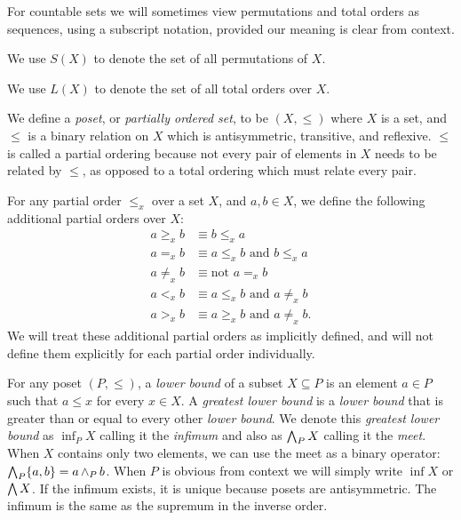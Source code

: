 	For countable sets we will sometimes view permutations and total orders as sequences, using a subscript notation, provided our meaning is clear from context.

	\begin{definition}
		We use $S(X)$ to denote the set of all permutations of $X$.
	\end{definition}

	\begin{definition}
		We use $L(X)$ to denote the set of all total orders over $X$.
	\end{definition}

	\begin{definition}
		We define a \emph{poset}, or \emph{partially ordered set}, to be $(X, \le)$ where $X$ is a set, and $\le$ is a binary relation on $X$ which is antisymmetric, transitive, and reflexive. $\le$ is called a partial ordering because not every pair of elements in $X$ needs to be related by $\le$, as opposed to a total ordering which must relate every pair.
	\end{definition}

	\begin{definition}
		For any partial order $\le_x$ over a set $X$, and $a, b \in X$, we define the following additional partial orders over $X$:
		\begin{align*}
			a \ge_x b &\equiv b \le_x a \\
			a =_x b &\equiv a \le_x b \text{ and } b \le_x a \\
			a \ne_x b &\equiv \text{not } a =_x b \\
			a <_x b &\equiv a \le_x b \text{ and } a \ne_x b \\
			a >_x b &\equiv a \ge_x b \text{ and } a \ne_x b.
		\end{align*}
		We will treat these additional partial orders as implicitly defined, and will not define them explicitly for each partial order individually.
	\end{definition}

	\begin{definition}
		For any poset $(P, \le)$, a \emph{lower bound} of a subset $X \subseteq P$ is an element $a \in P$ such that $a \le x$ for every $x \in X$. A \emph{greatest lower bound} is a \emph{lower bound} that is greater than or equal to every other \emph{lower bound}. We denote this \emph{greatest lower bound} as $\inf_P X$ calling it the \emph{infimum} \cite{birkhoﬀ1967lattice} and also as $\operatorname{\bigwedge}_P X$ calling it the \emph{meet}. When $X$ contains only two elements, we can use the meet as a binary operator: $\operatorname{\bigwedge}_P \{a, b\} = a \operatorname{\wedge}_P b$. When $P$ is obvious from context we will simply write $\inf X$ or $\operatorname{\bigwedge} X$. If the infimum exists, it is unique because posets are antisymmetric. The infimum is the same as the supremum in the inverse order.
	\end{definition}


